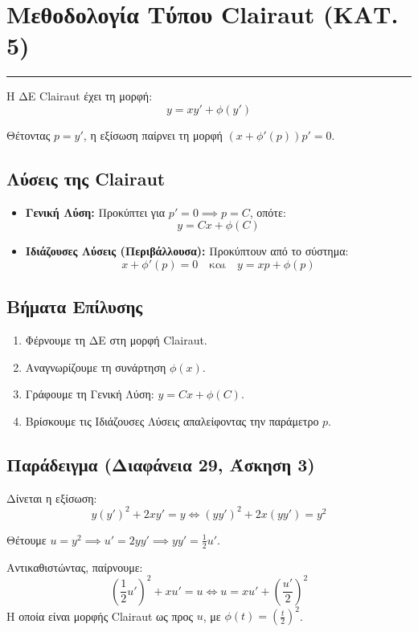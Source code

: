 \documentclass[12pt,a4paper]{article}
\begin{document}
\section*{Μεθοδολογία Τύπου Clairaut (ΚΑΤ. 5)}
\vspace{-1em}
\hrule
\vspace{1em}

Η ΔΕ Clairaut έχει τη μορφή:
\[
y = x y' + \phi(y')
\]

Θέτοντας $p = y'$, η εξίσωση παίρνει τη μορφή $\left( x + \phi'(p) \right) p' = 0$.

\subsection*{Λύσεις της Clairaut}
\begin{itemize}
    \item \textbf{Γενική Λύση:} Προκύπτει για $p' = 0 \implies p = C$, οπότε:
    \[
    y = C x + \phi(C)
    \]
    \item \textbf{Ιδιάζουσες Λύσεις (Περιβάλλουσα):} Προκύπτουν από το σύστημα:
    \[
    x + \phi'(p) = 0 \quad \text{και} \quad y = x p + \phi(p)
    \]
\end{itemize}

\subsection*{Βήματα Επίλυσης}
\begin{enumerate}[leftmargin=*]
    \item[0.] Φέρνουμε τη ΔΕ στη μορφή Clairaut.
    \item Αναγνωρίζουμε τη συνάρτηση $\phi(x)$.
    \item Γράφουμε τη Γενική Λύση: $y = C x + \phi(C)$.
    \item Βρίσκουμε τις Ιδιάζουσες Λύσεις απαλείφοντας την παράμετρο $p$.
\end{enumerate}

\subsection*{Παράδειγμα (Διαφάνεια 29, Άσκηση 3)}

Δίνεται η εξίσωση:
\[
y(y')^2 + 2xy' = y \iff (y y')^2 + 2x(y y') = y^2
\]

Θέτουμε $u = y^2 \implies u' = 2y y' \implies y y' = \frac{1}{2} u'$.

Αντικαθιστώντας, παίρνουμε:
\[
\left( \frac{1}{2} u' \right)^2 + x u' = u \iff u = x u' + \left( \frac{u'}{2} \right)^2
\]
Η οποία είναι μορφής Clairaut ως προς $u$, με $\phi(t) = \left(\frac{t}{2}\right)^2$.
\end{document}

